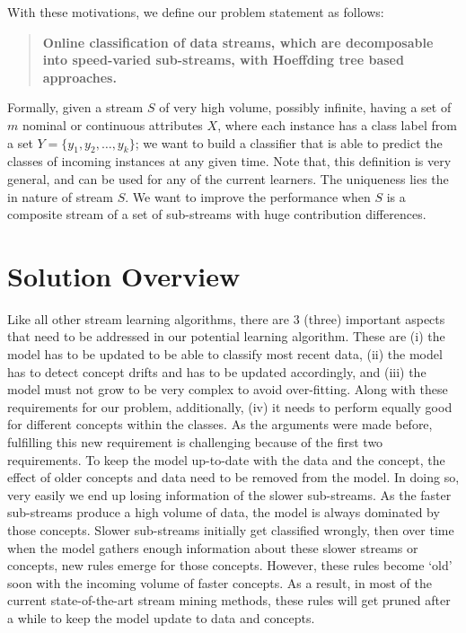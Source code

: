 With these motivations, we define our problem statement as follows:

\begin{quotation}
    \textbf{Online classification of data streams, which are decomposable into speed-varied sub-streams, with Hoeffding tree based approaches.}
\end{quotation}

\noindent Formally, given a stream $S$ of very high volume, possibly infinite, having a set of $m$ nominal or continuous attributes $X$, where each instance has a class label from a set $Y = \{y_1, y_2, \dots, y_k\}$; we want to build a classifier that is able to predict the classes of incoming instances at any given time. Note that, this definition is very general, and can be used for any of the current learners. The uniqueness lies the in nature of stream $S$. We want to improve the performance when $S$ is a composite stream of a set of sub-streams with huge contribution differences.


\section{Solution Overview}
Like all other stream learning algorithms, there are 3 (three) important aspects that need  to be addressed in our potential learning algorithm. These are (i) the model has to be updated to be able to classify most recent data, (ii) the model has to detect concept drifts and has to be updated accordingly, and (iii) the model must not grow to be very complex to avoid over-fitting. Along with these requirements for our problem, additionally, (iv) it needs to perform equally good for different concepts within the classes. As the arguments were made before, fulfilling this new requirement is challenging because of the first two requirements. To keep the model up-to-date with the data and the concept, the effect of older concepts and data need to be removed from the model. In doing so, very easily we end up losing information of the slower sub-streams. As the faster sub-streams produce a high volume of data, the model is always dominated by those concepts. Slower sub-streams initially get classified wrongly, then over time when the model gathers enough information about these slower streams or concepts, new rules emerge for those concepts. However, these rules become `old'  soon with the incoming volume of faster concepts. As a result, in most of the current state-of-the-art stream mining methods, these rules will get pruned after a while to keep the model update to data and concepts.

